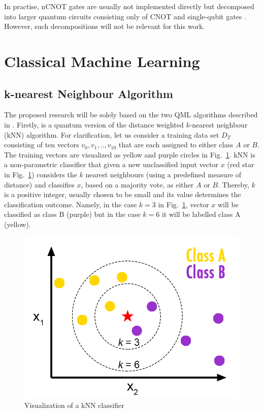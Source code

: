 In practise, nCNOT gates are usually not implemented directly but decomposed into larger quantum circuits consisting only of CNOT and single-qubit gates \cite{nielsen2010quantum}. However, such decompositions will not be relevant for this work.



\section{Classical Machine Learning}
\label{subsec:classicalmachinelearning}

\subsection{k-nearest Neighbour Algorithm}
\label{subsubsec:knearestneighbour}

The proposed research will be solely based on the two QML algorithms described in \cite{Schuld2014, Schuld2016}. Firstly, \cite{Schuld2014} is a quantum version of the distance weighted $k$-nearest neighbour (kNN) algorithm. For clarification, let us consider a training data set ${D}_{T}$ consisting of ten vectors ${v}_{0}, {v}_{1},..,{v}_{10}$ that are each assigned to either class $A$ or $B$. The training vectors are visualized as yellow and purple circles in Fig.~\ref{fig:knnconcept}. kNN is a non-parametric classifier that given a new unclassified input vector $x$ (red star in Fig.~\ref{fig:knnconcept}) considers the $k$ nearest neighbours (using a predefined measure of distance) and classifies $x$, based on a majority vote, as either $A$ or $B$. Thereby, $k$ is a positive integer, usually chosen to be small and its value determines the classification outcome. Namely, in the case $k = 3$ in Fig.~\ref{fig:knnconcept}, vector $x$ will be classified as class B (purple) but in the case $k = 6$ it will be labelled class A (yellow).

\begin{figure}[!ht]
      \centering
       \includegraphics[scale=0.55]{img/knn-concept.png}
       \caption[caption for kNN]{\label{fig:knnconcept} Visualization of a kNN classifier\footnotemark[3]}
\end{figure}

